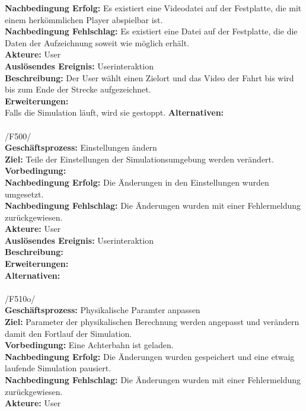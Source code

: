 \textbf{Nachbedingung Erfolg:} Es existiert eine Videodatei auf der Festplatte, die mit einem herkömmlichen Player abspielbar ist.\\
\textbf{Nachbedingung Fehlschlag:} Es existiert eine Datei auf der Festplatte, die die Daten der Aufzeichnung soweit wie möglich erhält.\\
\textbf{Akteure:} User\\
\textbf{Auslösendes Ereignis:} Userinteraktion\\
\textbf{Beschreibung:}  Der User wählt einen Zielort und das Video der Fahrt bis wird bis zum Ende der Strecke aufgezeichnet.\\
\textbf{Erweiterungen:}\\ Falls die Simulation läuft, wird sie gestoppt.
\textbf{Alternativen:}\\
\\
/F500/\\
\textbf{Geschäftsprozess:} Einstellungen ändern\\
\textbf{Ziel:} Teile der Einstellungen der Simulationsumgebung werden verändert.\\
\textbf{Vorbedingung:} \\
\textbf{Nachbedingung Erfolg:} Die Änderungen in den Einstellungen wurden umgesetzt.\\
\textbf{Nachbedingung Fehlschlag:}  Die Änderungen wurden mit einer Fehlermeldung zurückgewiesen.\\
\textbf{Akteure:} User\\
\textbf{Auslösendes Ereignis:} Userinteraktion\\
\textbf{Beschreibung:} \\
\textbf{Erweiterungen:}\\
\textbf{Alternativen:}\\
\\
/F510o/\\
\textbf{Geschäftsprozess:} Physikalische Paramter anpassen\\
\textbf{Ziel:} Parameter der physikalischen Berechnung werden angepasst und verändern damit den Fortlauf der Simulation.\\
\textbf{Vorbedingung:} Eine Achterbahn ist geladen.\\
\textbf{Nachbedingung Erfolg:} Die Änderungen wurden gespeichert und eine etwaig laufende Simulation pausiert.\\
\textbf{Nachbedingung Fehlschlag:} Die Änderungen wurden mit einer Fehlermeldung zurückgewiesen.\\
\textbf{Akteure:} User\\
